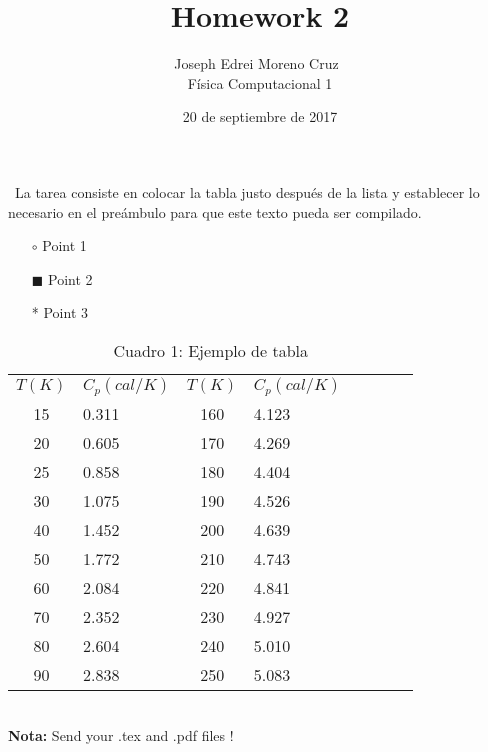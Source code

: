 \documentclass[12pt]{article}
\begin{document}
\begin{titlepage}
\title{Homework 2}
\author{Joseph Edrei Moreno Cruz~\\ 
F\'isica Computacional 1} 
\date{20 de septiembre de 2017}
\end{titlepage}
\maketitle
\, La tarea consiste en colocar la tabla justo despu\'es de la lista y establecer lo necesario en el pre\'ambulo para que este texto pueda ser compilado.

\begin{itemize}[noitemsep]
\item[$\circ$] Point 1
\end{itemize}
\begin{itemize}[noitemsep]
\item[\tiny{$\blacksquare$}] Point 2
\end{itemize}
\begin{itemize}[noitemsep]
\item [*] Point 3
\end{itemize}

\begin{table}[h]
\begin{center}
\begin{tabular}{clclclcl}
\(\displaystyle T (K)\) & \(\displaystyle C_p (cal/K)\) & \(\displaystyle T (K)\) & \(\displaystyle C_p (cal/K)\)\\
15 & 0.311 & 160 & 4.123\\
20 & 0.605 & 170 & 4.269\\
25 & 0.858 & 180 & 4.404\\
30 & 1.075 & 190 & 4.526\\
40 & 1.452 & 200 & 4.639\\
50 & 1.772 & 210 & 4.743\\
60 & 2.084 & 220 & 4.841\\
70 & 2.352 & 230 & 4.927\\
80 & 2.604 & 240 & 5.010\\
90 & 2.838 & 250 & 5.083\\
\end{tabular}
\end{center}

\caption*{Cuadro 1: Ejemplo de tabla}
\end{table}

~\\
\textbf{Nota:} Send your .tex and .pdf files !
\end{document}
